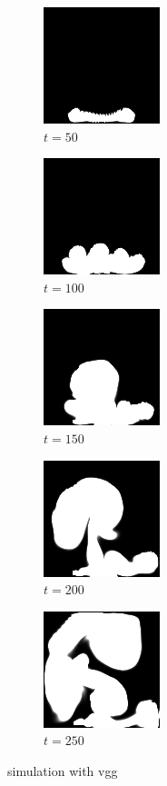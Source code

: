 \documentclass[a4paper,12pt,twoside]{report}
\begin{document}
\begin{figure}
\centering
\begin{subfigure}{0.18\textwidth}
  \centering
  \includegraphics[scale=0.56]{buoyancy_test/dens_000050_vgg.png}
  \caption{$t=50$}
\end{subfigure}
\begin{subfigure}{0.18\textwidth}
  \centering
  \includegraphics[scale=0.56]{buoyancy_test/dens_000100_vgg.png}
  \caption{$t=100$}
\end{subfigure}
\begin{subfigure}{0.18\textwidth}
  \centering
  \includegraphics[scale=0.56]{buoyancy_test/dens_000150_vgg.png}
  \caption{$t=150$}
\end{subfigure}
\begin{subfigure}{0.18\textwidth}
  \centering
  \includegraphics[scale=0.56]{buoyancy_test/dens_000200_vgg.png}
  \caption{$t=200$}
\end{subfigure}
\begin{subfigure}{0.18\textwidth}
  \centering
  \includegraphics[scale=0.56]{buoyancy_test/dens_000249_vgg.png}
  \caption{$t=250$}
\end{subfigure}
\caption{simulation with vgg}
\end{figure}
\end{document}
